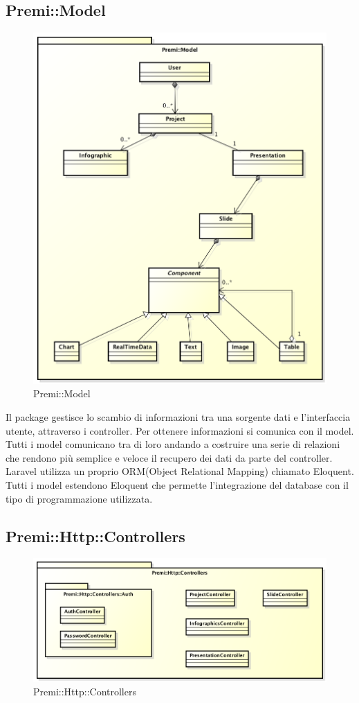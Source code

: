 \subsection{Premi::Model}
	\begin{figure}[h]
		\centering
		\includegraphics[width=0.7\linewidth]{img/back_end_premi_model}
		\caption[Premi::Model]{Premi::Model}
		\label{fig:back_end_premi_model}
	\end{figure}

	
Il package gestisce lo scambio di informazioni tra una sorgente dati e l'interfaccia utente, attraverso i controller. Per ottenere informazioni si comunica con il model. Tutti i model comunicano tra di loro andando a costruire una serie di relazioni che rendono più semplice e veloce il recupero dei dati da parte del controller. Laravel utilizza un proprio ORM(Object Relational Mapping) chiamato Eloquent. Tutti i model estendono Eloquent che permette l'integrazione del database con il tipo di programmazione utilizzata.

\newpage



\newpage
\subsection{Premi::Http::Controllers}
	\begin{figure}[h]
		\centering
		\includegraphics[width=0.7\linewidth]{img/back_end_premi_http_controllers}
		\caption[Premi::Http::Controllers]{Premi::Http::Controllers}
		\label{fig:back_end_premi_http_controllers}
	\end{figure}

